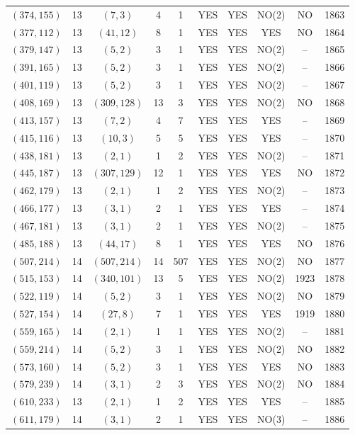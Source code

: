 \begin{longtable}{|c|c|c|c|c|c|c|c|c|c|}
$(374, 155)$ & 13 & $(7, 3)$ & 4 & 1 & YES & YES & NO(2) & NO & 1863\\
$(377, 112)$ & 13 & $(41, 12)$ & 8 & 1 & YES & YES & YES & NO & 1864\\
$(379, 147)$ & 13 & $(5, 2)$ & 3 & 1 & YES & YES & NO(2) & -- & 1865\\
$(391, 165)$ & 13 & $(5, 2)$ & 3 & 1 & YES & YES & NO(2) & -- & 1866\\
$(401, 119)$ & 13 & $(5, 2)$ & 3 & 1 & YES & YES & NO(2) & -- & 1867\\
$(408, 169)$ & 13 & $(309, 128)$ & 13 & 3 & YES & YES & NO(2) & NO & 1868\\
$(413, 157)$ & 13 & $(7, 2)$ & 4 & 7 & YES & YES & YES & -- & 1869\\
$(415, 116)$ & 13 & $(10, 3)$ & 5 & 5 & YES & YES & YES & -- & 1870\\
$(438, 181)$ & 13 & $(2, 1)$ & 1 & 2 & YES & YES & NO(2) & -- & 1871\\
$(445, 187)$ & 13 & $(307, 129)$ & 12 & 1 & YES & YES & YES & NO & 1872\\
$(462, 179)$ & 13 & $(2, 1)$ & 1 & 2 & YES & YES & NO(2) & -- & 1873\\
$(466, 177)$ & 13 & $(3, 1)$ & 2 & 1 & YES & YES & YES & -- & 1874\\
$(467, 181)$ & 13 & $(3, 1)$ & 2 & 1 & YES & YES & NO(2) & -- & 1875\\
$(485, 188)$ & 13 & $(44, 17)$ & 8 & 1 & YES & YES & YES & NO & 1876\\
$(507, 214)$ & 14 & $(507, 214)$ & 14 & 507 & YES & YES & NO(2) & NO & 1877\\
$(515, 153)$ & 14 & $(340, 101)$ & 13 & 5 & YES & YES & NO(2) & 1923 & 1878\\
$(522, 119)$ & 14 & $(5, 2)$ & 3 & 1 & YES & YES & NO(2) & NO & 1879\\
$(527, 154)$ & 14 & $(27, 8)$ & 7 & 1 & YES & YES & YES & 1919 & 1880\\
$(559, 165)$ & 14 & $(2, 1)$ & 1 & 1 & YES & YES & NO(2) & -- & 1881\\
$(559, 214)$ & 14 & $(5, 2)$ & 3 & 1 & YES & YES & NO(2) & NO & 1882\\
$(573, 160)$ & 14 & $(5, 2)$ & 3 & 1 & YES & YES & YES & NO & 1883\\
$(579, 239)$ & 14 & $(3, 1)$ & 2 & 3 & YES & YES & NO(2) & NO & 1884\\
$(610, 233)$ & 13 & $(2, 1)$ & 1 & 2 & YES & YES & YES & -- & 1885\\
$(611, 179)$ & 14 & $(3, 1)$ & 2 & 1 & YES & YES & NO(3) & -- & 1886\\

\end{longtable}
